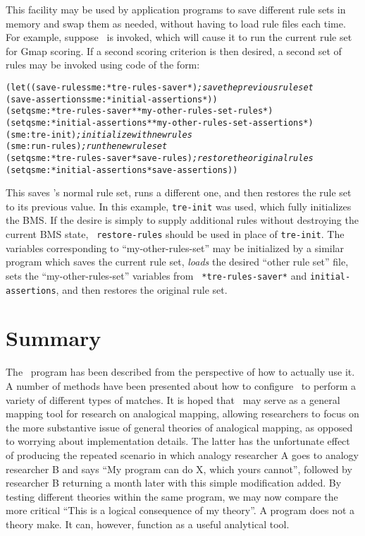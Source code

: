 This facility may be used by application programs to save different rule
sets in memory and swap them as needed, without having to load rule files
each time. For example, suppose \SME\ is invoked, which will cause it to run
the current rule set for Gmap scoring. If a second scoring criterion is then
desired, a second set of rules may be invoked using code of the form:
\begin{small}
\begin{alltt}
   (let ((save-rules sme:*tre-rules-saver*)          {\it ;save the previous rule set}
         (save-assertions sme:*initial-assertions*))
     (setq sme:*tre-rules-saver* *my-other-rules-set-rules*)
     (setq sme:*initial-assertions* *my-other-rules-set-assertions*)
     (sme:tre-init)                                  {\it ;initialize with new rules}
     (sme:run-rules)                                 {\it ;run the new rule set}
     (setq sme:*tre-rules-saver* save-rules)         {\it ;restore the original rules}
     (setq sme:*initial-assertions* save-assertions))
\end{alltt}
\end{small}
This saves \SME's normal rule set, runs a different one, and then restores
the rule set to its previous value. In this example, {\tt tre-init} was
used, which fully initializes the BMS. If the desire is simply to supply
additional rules without destroying the current BMS state, {\tt
restore-rules} should be used in place of {\tt tre-init}.  The variables
corresponding to ``my-other-rules-set'' may be initialized by a similar
program which saves the current rule set, {\it loads} the desired ``other
rule set'' file, sets the ``my-other-rules-set'' variables from {\tt
*tre-rules-saver*} and {\tt *initial-assertions}, and then restores the
original rule set.


\section{Summary}

The \SME\ program has been described from the perspective of how to actually
use it. A number of methods have been presented about how to configure \SME\
to perform a variety of different types of matches.  It is hoped that \SME\
may serve as a general mapping tool for research on analogical mapping,
allowing researchers to focus on the more substantive issue of general
theories of analogical mapping, as opposed to worrying about implementation
details. The latter has the unfortunate effect of producing the repeated
scenario in which analogy researcher A goes to analogy researcher B and says
``My program can do X, which yours cannot'', followed by researcher B
returning a month later with this simple modification added. By testing
different theories within the same program, we may now compare the more
critical ``This is a logical consequence of my theory''. A program does not
a theory make. It can, however, function as a useful analytical tool.

